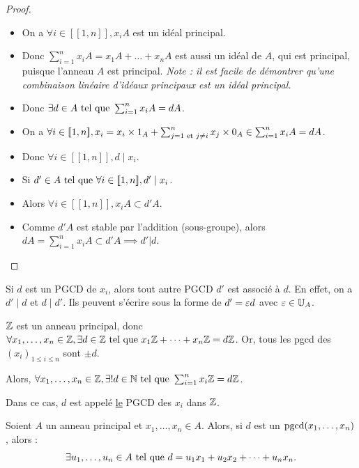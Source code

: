 \documentclass[12pt, a4paper]{report}
\begin{document}
\begin{proof}
    \begin{itemize}
        \item On a $\forall i \in [\![1,n]\!], x_iA$ est un idéal principal.
        \item Donc $\sum_{i=1}^{n}x_iA = x_1A + \dots + x_nA$ est aussi un idéal de $A$, qui est principal, puisque l'anneau $A$ est principal. \textit{Note : il est facile de démontrer qu'une combinaison linéaire d'idéaux principaux est un idéal principal.}
        \item Donc $\exists d \in A \text{ tel que } \sum_{i=1}^{n}x_iA = dA$.
        \item On a $\forall i \in [\![1,n]\!], x_i = x_i\times 1_A + \sum_{j=1\text{ et } j\neq i}^{n}x_j \times 0_A \in \sum_{i=1}^{n}x_iA = dA$.
        \item Donc $\forall i \in [\![1,n]\!], d \mid x_i$.
        \item Si $d' \in A \text{ tel que } \forall i \in [\![1,n]\!], d' \mid x_i$.
        \item Alors $\forall i \in [\![1,n]\!], x_iA \subset d'A$.
        \item Comme $d'A$ est stable par l'addition (sous-groupe), alors $dA = \sum_{i=1}^{n}x_iA \subset d'A \implies d'|d$.
    \end{itemize}
\end{proof}

\begin{remark}
    Si $d$ est un PGCD de $x_i$, alors tout autre PGCD $d'$ est associé à $d$. En effet, on a $d' \mid d$ et $d \mid d'$. Ils peuvent s'écrire sous la forme de $d' = \varepsilon d$ avec $\varepsilon \in \mathbb{U}_A$.
\end{remark}

\begin{remark}
    $\mathbb{Z}$ est un anneau principal, donc $\forall x_1,\dots,x_n \in \mathbb{Z},\exists d \in \mathbb{Z} \text{ tel que } x_1\mathbb{Z} + \dots + x_n\mathbb{Z}=d\mathbb{Z}$. Or, tous les pgcd des $(x_i)_{1\leq i \leq n}$ sont $\pm d$.

    Alors, $\forall x_1,\dots,x_n \in \mathbb{Z}, \exists! d \in \mathbb{N} \text{ tel que } \sum_{i=1}^n x_i\mathbb{Z} = d\mathbb{Z}$.

    Dans ce cas, $d$ est appelé \underline{le} PGCD des $x_i$ dans $\mathbb{Z}$.
\end{remark}

\begin{theorem}
    Soient $A$ un anneau principal et $x_1,\dots,x_n \in A$. Alors, si $d$ est un $\mathrm{pgcd}(x_1,\dots,x_n)$, alors :
    \[
        \exists u_1,\dots,u_n \in A \text{ tel que } d = u_1 x_1 + u_2 x_2 + \dots + u_n x_n.
    \]
\end{theorem}
\end{document}
